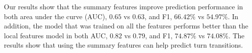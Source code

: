 Our results show that the summary features improve prediction performance in both area under the curve (AUC), $0.65$ vs $0.63$, and F1, $66.42\%$ vs $54.97\%$. In addition, the model that was trained on all the features performs better than the local features model in both AUC, $0.82$ vs $0.79$, and F1, $74.87\%$ vs $74.08\%$. The results show that using the summary features can help predict turn transitions. 